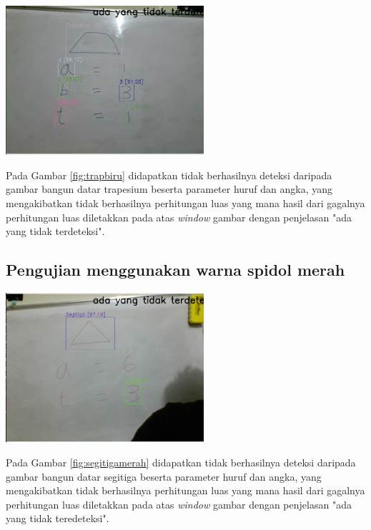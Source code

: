 \begin{center}
	\includegraphics[width=0.55\textwidth]{gambar/trapesium biru.png}
	\label{fig:trapbiru}
\end{center}
Pada Gambar \ref{fig:trapbiru} didapatkan tidak berhasilnya deteksi daripada gambar bangun datar trapesium beserta parameter huruf dan angka, yang mengakibatkan tidak berhasilnya perhitungan luas yang mana hasil dari gagalnya perhitungan luas diletakkan pada atas \textit{window} gambar dengan penjelasan "ada yang tidak terdeteksi".

\subsection{Pengujian menggunakan warna spidol merah}
\begin{center}
	\includegraphics[width=0.55\textwidth]{gambar/segitiga merah.png}
	\label{fig:segitigamerah}
\end{center}
Pada Gambar \ref{fig:segitigamerah} didapatkan tidak berhasilnya deteksi daripada gambar bangun datar segitiga beserta parameter huruf dan angka, yang mengakibatkan tidak berhasilnya perhitungan luas yang mana hasil dari gagalnya perhitungan luas diletakkan pada atas \textit{window} gambar dengan penjelasan "ada yang tidak teredeteksi".

